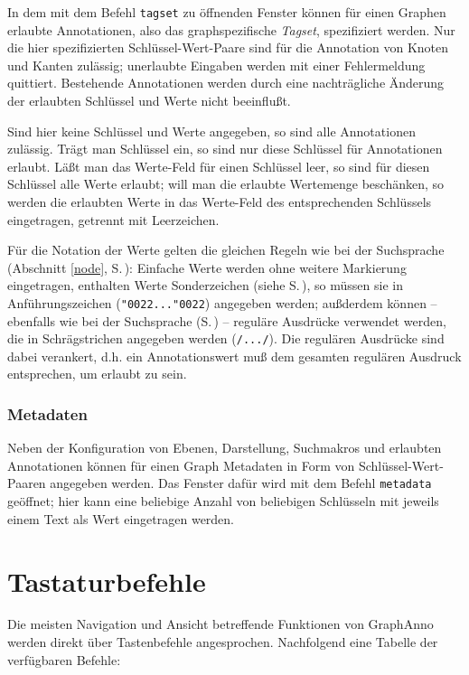 \documentclass[12pt]{scrartcl}
\newcommand{\quo}{\char"0022}
\begin{document}
In dem mit dem Befehl \texttt{tagset} zu öffnenden Fenster können für einen Graphen erlaubte Annotationen, also das graphspezifische \textit{Tagset}, spezifiziert werden. Nur die hier spezifizierten Schlüssel-Wert-Paare sind für die Annotation von Knoten und Kanten zulässig; unerlaubte Eingaben werden mit einer Fehlermeldung quittiert. Bestehende Annotationen werden durch eine nachträgliche Änderung der erlaubten Schlüssel und Werte nicht beeinflußt.

Sind hier keine Schlüssel und Werte angegeben, so sind alle Annotationen zulässig. Trägt man Schlüssel ein, so sind nur diese Schlüssel für Annotationen erlaubt. Läßt man das Werte-Feld für einen Schlüssel leer, so sind für diesen Schlüssel alle Werte erlaubt; will man die erlaubte Wertemenge beschänken, so werden die erlaubten Werte in das Werte-Feld des entsprechenden Schlüssels eingetragen, getrennt mit Leerzeichen.

Für die Notation der Werte gelten die gleichen Regeln wie bei der Suchsprache (Abschnitt \ref{node}, S.\,\pageref{zeichenketten}): Einfache Werte werden ohne weitere Markierung eingetragen, enthalten Werte Sonderzeichen (siehe S.\,\pageref{zeichenketten}), so müssen sie in Anführungszeichen (\texttt{\quo...\quo}) angegeben werden; außderdem können – ebenfalls wie bei der Suchsprache (S.\,\pageref{zeichenketten}) – reguläre Ausdrücke verwendet werden, die in Schrägstrichen angegeben werden (\texttt{/.../}). Die regulären Ausdrücke sind dabei verankert, d.h. ein Annotationswert muß dem gesamten regulären Ausdruck entsprechen, um erlaubt zu sein.

\subsubsection{Metadaten}

Neben der Konfiguration von Ebenen, Darstellung, Suchmakros und erlaubten Annotationen können für einen Graph Metadaten in Form von Schlüssel-Wert-Paaren angegeben werden. Das Fenster dafür wird mit dem Befehl \texttt{metadata} geöffnet; hier kann eine beliebige Anzahl von beliebigen Schlüsseln mit jeweils einem Text als Wert eingetragen werden.



\section{Tastaturbefehle}

Die meisten Navigation und Ansicht betreffende Funktionen von GraphAnno werden direkt über Tastenbefehle angesprochen. Nachfolgend eine Tabelle der verfügbaren Befehle:
\end{document}
